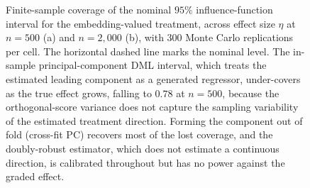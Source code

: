\begin{figure}[!htbp]
\caption{Finite-sample coverage of the nominal $95\%$ influence-function interval
for the embedding-valued treatment, across effect size $\eta$ at $n=500$ (a) and
$n=2{,}000$ (b), with $300$ Monte Carlo replications per cell. The horizontal
dashed line marks the nominal level. The in-sample principal-component DML
interval, which treats the estimated leading component as a generated regressor,
under-covers as the true effect grows, falling to $0.78$ at $n=500$, because the
orthogonal-score variance does not capture the sampling variability of the
estimated treatment direction. Forming the component out of fold (cross-fit PC)
recovers most of the lost coverage, and the doubly-robust estimator, which does
not estimate a continuous direction, is calibrated throughout but has no power
against the graded effect.}
\label{fig:sim-coverage}
\end{figure}

